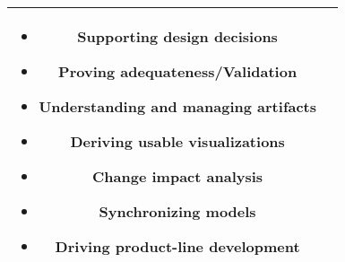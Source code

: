 \begin{tabular}{|c|c|}
\begin{minipage}[t][][c]{0.5\textwidth}
\begin{itemize}
\item Supporting design decisions
\item Proving adequateness/Validation
\item Understanding and managing artifacts
\item Deriving usable visualizations
\item Change impact analysis
\item Synchronizing models
\item Driving product-line development

\end{itemize}
\vspace{0.1cm}
\end{minipage}

\\\hline

\end{tabular}